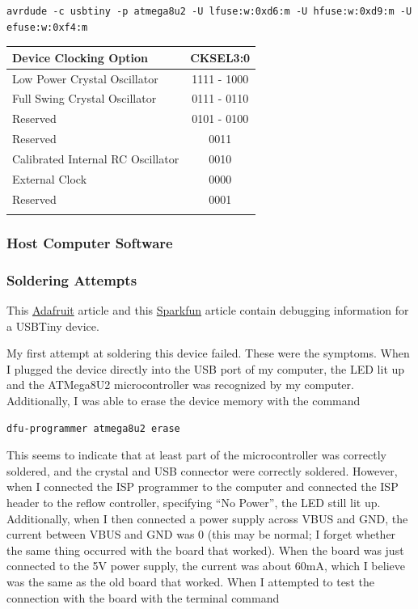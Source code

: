 \documentclass[11pt,twoside,a4paper]{report}
\begin{document}
\begin{lstlisting}[mathescape]
avrdude -c usbtiny -p atmega8u2 -U lfuse:w:0xd6:m -U hfuse:w:0xd9:m -U efuse:w:0xf4:m
\end{lstlisting}

\begin{center}
\begin{tabular}{l c}
  \textbf{Device Clocking Option} & \textbf{CKSEL3:0} \\
  \hline
  Low Power Crystal Oscillator & 1111 - 1000 \\
  Full Swing Crystal Oscillator & 0111 - 0110 \\
  Reserved & 0101 - 0100 \\
  Reserved & 0011 \\
  Calibrated Internal RC Oscillator & 0010 \\
  External Clock & 0000 \\
  Reserved & 0001 \\
  \label{tab:device-clocking-options}
\end{tabular}
\end{center}


\subsubsection{Host Computer Software}


\subsubsection{Soldering Attempts}
This \href{https://learn.adafruit.com/usbtinyisp/help}{Adafruit} article and this
\href{https://learn.sparkfun.com/tutorials/pocket-avr-programmer-hookup-guide/discuss}{Sparkfun}
article contain debugging information for a USBTiny device.\newline

My first attempt at soldering this device failed. These were the symptoms. When I plugged the device
directly into the USB port of my computer, the LED lit up and the ATMega8U2 microcontroller was
recognized by my computer. Additionally, I was able to erase the device memory with the command

\begin{lstlisting}[mathescape]
dfu-programmer atmega8u2 erase
\end{lstlisting}

This seems to indicate that at least part of the microcontroller was correctly soldered, and the
crystal and USB connector were correctly soldered. However, when I connected the ISP programmer to
the computer and connected the ISP header to the reflow controller, specifying ``No Power'', the LED
still lit up. Additionally, when I then connected a power supply across VBUS and GND, the current
between VBUS and GND was 0 (this may be normal; I forget whether the same thing occurred with the
board that worked). When the board was just connected to the 5V power supply, the current was about
60mA, which I believe was the same as the old board that worked. When I attempted to test the
connection with the board with the terminal command
\end{document}

